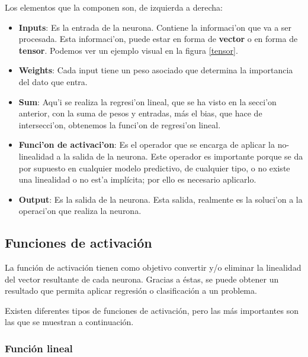 Los elementos que la componen son, de izquierda a derecha:
\begin{itemize}

\item \textbf{Inputs}: Es la entrada de la neurona. Contiene la informaci'on que va a ser procesada. Esta informaci'on, puede estar en forma de \textbf{vector} o en forma de \textbf{tensor}. Podemos ver un ejemplo visual en la figura \ref{tensor}.


\item \textbf{Weights}: Cada input tiene un peso asociado que determina la importancia del dato que entra. 
\item \textbf{Sum}: Aqu'i se realiza la regresi'on lineal, que se ha visto en la secci'on anterior, con la suma de pesos y entradas, más el bias, que hace de intersecci'on, obtenemos la funci'on de regresi'on lineal.
\item \textbf{Funci'on de activaci'on}: Es el operador que se encarga de aplicar la no-linealidad a la salida de la neurona. Este operador es importante porque se da por supuesto en cualquier modelo predictivo, de cualquier tipo, o no existe una linealidad o no est'a implícita; por ello es necesario aplicarlo.

\item \textbf{Output}: Es la salida de la neurona. Esta salida, realmente es la soluci'on a la operaci'on que realiza la neurona.

\end{itemize}

\clearpage

\subsection{Funciones de activación}

La función de activación tienen como objetivo convertir y/o  eliminar la linealidad del vector resultante de cada neurona. Gracias a éstas, se puede obtener un resultado que permita aplicar regresión o clasificación a un problema.

Existen diferentes tipos de funciones de activación, pero las más importantes son las que se muestran a continuación.

\subsubsection{Función lineal}


